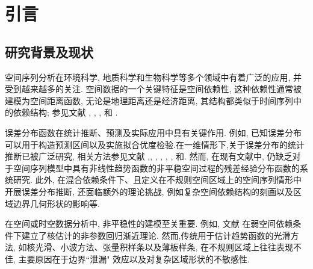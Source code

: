 \documentclass[a4paper,openay,14pt]{ctexbook}
\numberwithin{equation}{section}
\numberwithin{lem}{section}
\newcommand{\chapterwithfancyheader}[1]{  
    \chapter{#1} %
    \thispagestyle{fancy} %
}
\begin{document}
\baselineskip=30pt
%


\clearpage %
\tableofcontents
\thispagestyle{empty}
\listoftables
\let\cleardoublepage\clearpage
\listoffigures

\mainmatter
\pagestyle{fancy}\fancyhf{}
\fancyhead[EL]{\leftmark}
\fancyhead[OR]{\leftmark}
\fancyfoot[C]{\thepage }

\chapterwithfancyheader{引言}
\section{研究背景及现状}

空间序列分析在环境科学, 地质科学和生物科学等多个领域中有着广泛的应用, 并受到越来越多的关注. 
空间数据的一个关键特征是空间依赖性, 这种依赖性通常被建模为空间距离函数, 
无论是地理距离还是经济距离, 其结构都类似于时间序列中的依赖结构; 
参见文献 \cite{whittle1954stationary}, \cite{anselin1980estimation}, 
\cite{yao2006gaussian}, \cite{robinson2011asymptotic} 和 \cite{cressie2015statistics}.

误差分布函数在统计推断、预测及实际应用中具有关键作用. 例如, 已知误差分布可以用于构造预测区间以及实施拟合优度检验.在一维情形下,关于误差分布的统计推断已被广泛研究, 相关方法参见文献
\cite{akritas2001non},\cite{cheng2002consistency}, \cite{cheng2005asymptotic}, \cite{muller2007estimating}, \cite{chan2008residual}, \cite{kiwitt2012estimating}, \cite{gu2021smooth}和\cite{zhong2025inference}.
然而, 在现有文献中, 仍缺乏对于空间序列模型中具有非线性趋势函数的非平稳空间过程的残差经验分布函数的系统研究. 此外, 在混合依赖条件下、且定义在不规则空间区域上的空间序列情形中开展误差分布推断, 还面临额外的理论挑战, 例如复杂空间依赖结构的刻画以及区域边界几何形状的影响等.

在空间或时空数据分析中, 非平稳性的建模至关重要. 例如, 文献\cite{robinson2011asymptotic} 在弱空间依赖条件下建立了核估计的非参数回归渐近理论.  然而,传统用于估计趋势函数的光滑方法, 如核光滑、小波方法、张量积样条以及薄板样条, 在不规则区域上往往表现不佳, 主要原因在于边界``泄漏" 效应以及对复杂区域形状的不敏感性.
\end{document}
